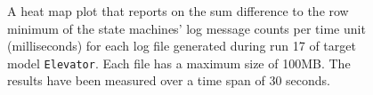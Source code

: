 \begin{figure}[htbp]
\centering
\begin{minipage}{1\textwidth}
  \centering
\end{minipage}
\caption{A heat map plot that reports on the sum difference to the row minimum of the state machines' log message counts per time unit (milliseconds) for each log file generated during run 17 of target model \texttt{Elevator}. Each file has a maximum size of 100MB. The results have been measured over a time span of 30 seconds.}
\label{figure:throughput_difference_elevator_17}
\end{figure}